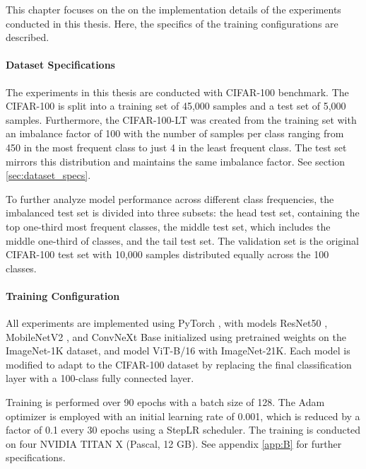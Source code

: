 
This chapter focuses on the on the implementation details of the experiments conducted in this thesis. Here, the specifics of the training configurations are described. 

\paragraph{Dataset Specifications}
The experiments in this thesis are conducted with CIFAR-100 \cite{krizhevsky2009learning} benchmark. The CIFAR-100 is split into a training set of 45,000 samples and a test set of 5,000 samples. Furthermore, the CIFAR-100-LT was created from the training set with an imbalance factor of 100 with the number of samples per class ranging from 450 in the most frequent class to just 4 in the least frequent class. The test set mirrors this distribution and maintains the same imbalance factor. See section \ref{sec:dataset_specs}.

To further analyze model performance across different class frequencies, the imbalanced test set is divided into three subsets: the head test set, containing the top one-third most frequent classes, the middle test set, which includes the middle one-third of classes, and the tail test set. The validation set is the original CIFAR-100 test set with 10,000 samples distributed equally across the 100 classes.

\paragraph{Training Configuration}
All experiments are implemented using PyTorch \cite{paszke2019pytorchimperativestylehighperformance}, with models ResNet50 \cite{he2015deepresiduallearningimage}, MobileNetV2 \cite{sandler2018mobilenetv2}, and ConvNeXt Base \cite{todi2023convnext} initialized using pretrained weights on the ImageNet-1K dataset, and model ViT-B/16 \cite{dosovitskiy2021imageworth16x16words} with ImageNet-21K. Each model is modified to adapt to the CIFAR-100 dataset by replacing the final classification layer with a 100-class fully connected layer.

Training is performed over 90 epochs with a batch size of 128. The Adam optimizer \cite{kingma2017adammethodstochasticoptimization} is employed with an initial learning rate of 0.001, which is reduced by a factor of 0.1 every 30 epochs using a StepLR scheduler. The training is conducted on four NVIDIA TITAN X (Pascal, 12 GB). See appendix \ref{app:B} for further specifications.

